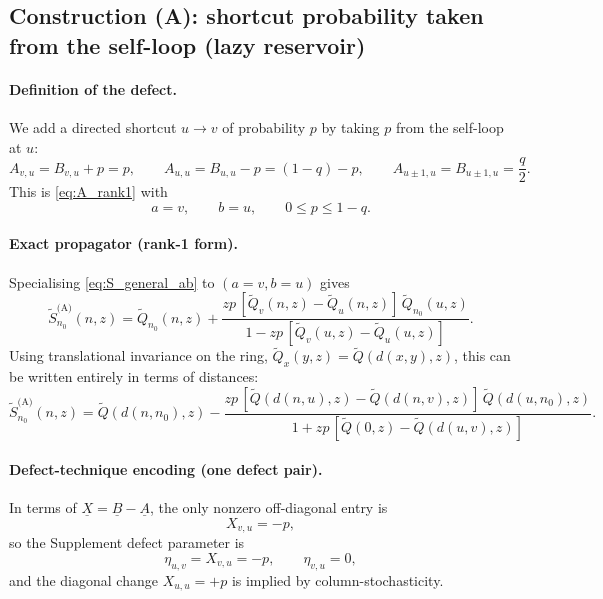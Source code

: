 \documentclass[11pt]{article}
\begin{document}
\subsection{Construction (A): shortcut probability taken from the self-loop (lazy reservoir)}

\paragraph{Definition of the defect.}
We add a directed shortcut $u\to v$ of probability $p$ by taking $p$ from the self-loop at $u$:
\[
A_{v,u}=B_{v,u}+p=p,\qquad
A_{u,u}=B_{u,u}-p=(1-q)-p,
\qquad
A_{u\pm1,u}=B_{u\pm1,u}=\frac q2.
\]
This is \eqref{eq:A_rank1} with
\[
a=v,\qquad b=u,
\qquad 0\le p\le 1-q.
\]

\paragraph{Exact propagator (rank-1 form).}
Specialising \eqref{eq:S_general_ab} to $(a=v,b=u)$ gives
\begin{equation}
\boxed{
\tilde S^{\text{(A)}}_{n_0}(n,z)
=
\tilde Q_{n_0}(n,z)
+
\frac{z p\,[\tilde Q_v(n,z)-\tilde Q_u(n,z)]\,\tilde Q_{n_0}(u,z)}
{1-z p\,[\tilde Q_v(u,z)-\tilde Q_u(u,z)]}.
}
\label{eq:S_A_uv}
\end{equation}
Using translational invariance on the ring, $\tilde Q_x(y,z)=\tilde Q(d(x,y),z)$, this can be written entirely in terms of distances:
\begin{equation}
\boxed{
\tilde S^{\text{(A)}}_{n_0}(n,z)
=
\tilde Q(d(n,n_0),z)
-
\frac{z p\,[\tilde Q(d(n,u),z)-\tilde Q(d(n,v),z)]\,\tilde Q(d(u,n_0),z)}
{1+z p\,[\tilde Q(0,z)-\tilde Q(d(u,v),z)]}.
}
\label{eq:S_A_dist}
\end{equation}

\paragraph{Defect-technique encoding (one defect pair).}
In terms of $\underline{X}=\underline{B}-\underline{A}$, the only nonzero off-diagonal entry is
\[
X_{v,u}=-p,
\]
so the Supplement defect parameter is
\[
\eta_{u,v}=X_{v,u}=-p,\qquad \eta_{v,u}=0,
\]
and the diagonal change $X_{u,u}=+p$ is implied by column-stochasticity.
\end{document}
